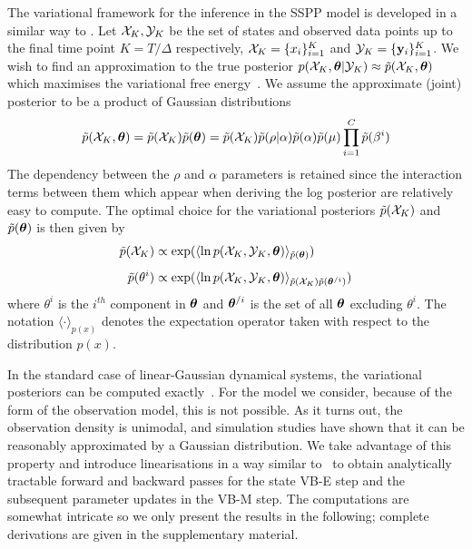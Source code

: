 \documentclass{article}
\begin{document}
The variational framework for the inference in the SSPP model is developed in a similar way to
\cite{Beal_2003b}. Let $\mathcal{X}_K, \mathcal{Y}_K$ be the set of states and observed data points up to the final
time point $K = T/\Delta$ respectively, $\mathcal{X}_K = \{x_i\}_{i=1}^K$ and $\mathcal{Y}_K = \{{\bf y}_i\}_{i=1}^K$. We
wish to find an approximation to the true posterior $p(\mathcal{X}_K,{\bm \theta} | \mathcal{Y}_K) \approx
\tilde{p}(\mathcal{X}_K,{\bm \theta})$ which maximises the variational free energy~\cite{Attias_1999}. We assume the
approximate (joint) posterior to be a product of Gaussian distributions \begin{equation}\label{eq:
	VarApproximation} \pt(\X_K,\thetab)=
	\pt(\X_K)\pt(\thetab)=\pt(\X_K)\pt(\rho|\alpha)\pt(\alpha)\pt(\mu)\prod_{i=1}^C\pt(\beta^i)
\end{equation} The dependency between the $\rho$ and $\alpha$ parameters is retained since the
interaction terms between them which appear when deriving the log posterior are relatively easy to
compute.  The optimal choice for the variational posteriors $\tilde{p}(\mathcal{X}_K)$ and $\tilde{p}({\bm \theta})$  is then
given by \begin{subequations}\label{eq:VBmarginals} \begin{align} \pt(\X_K)&\propto \exp(\langle\ln
	p(\X_K,\Y_K,\thetab)\rangle_{\pt(\thetab)}) \label{eq:xkmarginal}\\[1ex]
	\pt(\theta^i)&\propto \exp(\langle\ln
	p(\X_K,\Y_K,\thetab)\rangle_{\pt(\X_K)\pt(\thetab^{/i})}) \label{eq:thetakmarginal}
\end{align} \end{subequations} \noindent where $\theta^i$ is the $i^{th}$ component in ${\bm \theta}$ and
${\bm \theta}^{/i}$ is the set of all ${\bm \theta}$ excluding  $\theta^i$. The notation $\langle \cdot
\rangle_{p(x)}$ denotes the expectation operator taken with respect to the distribution $p(x)$.

In the standard case of linear-Gaussian dynamical systems, the variational posteriors can be
computed exactly~\cite{Beal_2003b}. For the model we consider, because of the form of the
observation model, this is not possible. As it turns out, the observation density is unimodal, and
simulation studies have shown that it can be reasonably approximated by a Gaussian distribution. We
take advantage of this property and introduce linearisations in a way similar to~\cite{Smith_2003}
to obtain analytically tractable forward and backward passes for the state VB-E step and the
subsequent parameter updates in the VB-M step. The computations are somewhat intricate so we only present the results in the following; complete derivations are given in the supplementary material.
\end{document}
